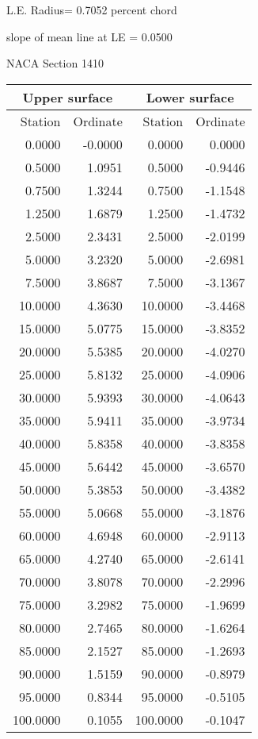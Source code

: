 \documentclass[11pt]{book}
\begin{document}
L.E. Radius=  0.7052 percent chord


 slope of mean line at LE =  0.0500
 \newpage
  \label{s1410}
 \begin{Large}
 NACA Section 1410
 \end{Large}
  
 \vspace{8mm}
 \begin{tabular}{|r|r|r|r|} \hline 
 \multicolumn{2}{|c|}{Upper surface} & \multicolumn{2}{|c|}{Lower surface} \\
 \hline
 Station & Ordinate & Station & Ordinate \\
 \hline
0.0000 & -0.0000 & 0.0000 & 0.0000 \\
0.5000 & 1.0951 & 0.5000 & -0.9446 \\
0.7500 & 1.3244 & 0.7500 & -1.1548 \\
1.2500 & 1.6879 & 1.2500 & -1.4732 \\
2.5000 & 2.3431 & 2.5000 & -2.0199 \\
5.0000 & 3.2320 & 5.0000 & -2.6981 \\
7.5000 & 3.8687 & 7.5000 & -3.1367 \\
10.0000 & 4.3630 & 10.0000 & -3.4468 \\
15.0000 & 5.0775 & 15.0000 & -3.8352 \\
20.0000 & 5.5385 & 20.0000 & -4.0270 \\
25.0000 & 5.8132 & 25.0000 & -4.0906 \\
30.0000 & 5.9393 & 30.0000 & -4.0643 \\
35.0000 & 5.9411 & 35.0000 & -3.9734 \\
40.0000 & 5.8358 & 40.0000 & -3.8358 \\
45.0000 & 5.6442 & 45.0000 & -3.6570 \\
50.0000 & 5.3853 & 50.0000 & -3.4382 \\
55.0000 & 5.0668 & 55.0000 & -3.1876 \\
60.0000 & 4.6948 & 60.0000 & -2.9113 \\
65.0000 & 4.2740 & 65.0000 & -2.6141 \\
70.0000 & 3.8078 & 70.0000 & -2.2996 \\
75.0000 & 3.2982 & 75.0000 & -1.9699 \\
80.0000 & 2.7465 & 80.0000 & -1.6264 \\
85.0000 & 2.1527 & 85.0000 & -1.2693 \\
90.0000 & 1.5159 & 90.0000 & -0.8979 \\
95.0000 & 0.8344 & 95.0000 & -0.5105 \\
100.0000 & 0.1055 & 100.0000 & -0.1047 \\
 \hline 
 \end{tabular}
\end{document}
